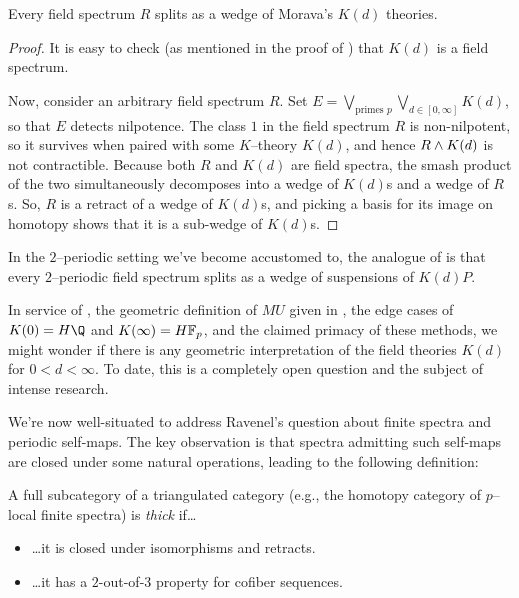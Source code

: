\begin{corollary}\label{FieldSpectraAreKTheories}
Every field spectrum $R$ splits as a wedge of Morava's $K(d)$ theories.
\end{corollary}
\begin{proof}
It is easy to check (as mentioned in the proof of ) that $K(d)$ is a field spectrum.

Now, consider an arbitrary field spectrum $R$.  Set $E = \bigvee_{\text{primes $p$}} \bigvee_{d \in [0, \infty]} K(d)$, so that $E$ detects nilpotence.  The class $1$ in the field spectrum $R$ is non-nilpotent, so it survives when paired with some $K$--theory $K(d)$, and hence $R \wedge K(d)$ is not contractible.  Because both $R$ and $K(d)$ are field spectra, the smash product of the two simultaneously decomposes into a wedge of $K(d)$s and a wedge of $R$s.  So, $R$ is a retract of a wedge of $K(d)$s, and picking a basis for its image on homotopy shows that it is a sub-wedge of $K(d)$s.
\end{proof}

\begin{remark}
In the $2$--periodic setting we've become accustomed to, the analogue of  is that every $2$--periodic field spectrum splits as a wedge of suspensions of $K(d)P$.
\end{remark}

\begin{remark}
In service of , the geometric definition of $MU$ given in , the edge cases of $K(0) = H\Q$ and $K(\infty) = \HFp$, and the claimed primacy of these methods, we might wonder if there is any geometric interpretation of the field theories $K(d)$ for $0 < d < \infty$.  To date, this is a completely open question and the subject of intense research.
\end{remark}

We're now well-situated to address Ravenel's question about finite spectra and periodic self-maps.  The key observation is that spectra admitting such self-maps are closed under some natural operations, leading to the following definition:

\begin{definition}
A full subcategory of a triangulated category (e.g., the homotopy category of $p$--local finite spectra) is \textit{thick} if\ldots
\begin{itemize}
\item \ldots it is closed under isomorphisms and retracts.
\item \ldots it has a $2$-out-of-$3$ property for cofiber sequences.
\end{itemize}
\end{definition}

